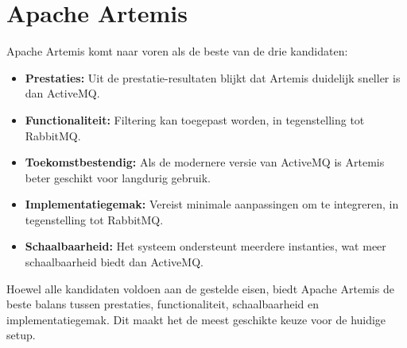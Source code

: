 \section{Apache Artemis}
Apache Artemis komt naar voren als de beste van de drie kandidaten:
\begin{itemize} 
    \item \textbf{Prestaties:} Uit de prestatie-resultaten blijkt dat Artemis duidelijk sneller is dan ActiveMQ. 
    \item \textbf{Functionaliteit:} Filtering kan toegepast worden, in tegenstelling tot RabbitMQ. 
    \item \textbf{Toekomstbestendig:} Als de modernere versie van ActiveMQ is Artemis beter geschikt voor langdurig gebruik. 
    \item \textbf{Implementatiegemak:} Vereist minimale aanpassingen om te integreren, in tegenstelling tot RabbitMQ. 
    \item \textbf{Schaalbaarheid:} Het systeem ondersteunt meerdere instanties, wat meer schaalbaarheid biedt dan ActiveMQ. 
\end{itemize}

Hoewel alle kandidaten voldoen aan de gestelde eisen, biedt Apache Artemis de beste balans tussen prestaties,
functionaliteit, schaalbaarheid en implementatiegemak. Dit maakt het de meest geschikte keuze voor de huidige setup.



